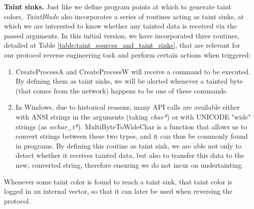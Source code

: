 \documentclass[conference]{IEEEtran}
\begin{document}
\textbf{Taint sinks.} Just like we define program points at which to generate taint colors,
\textit{TaintBlade} also incorporates a series of routines acting as taint sinks,
at which we are interested to know whether any tainted data is received via the passed
arguments. In this initial version, we have incorporated three routines, detailed at
Table \ref{table:taint_sources_and_taint_sinks}, that are relevant for our protocol
reverse engineering task and perform certain actions when triggered:
\begin{enumerate}
    \item CreateProcessA and CreateProcessW will receive a command to be executed. By
          defining them as taint sinks, we will be alerted whenever a tainted byte (that
          comes from the network) happens to be one of these commands.
    \item In Windows, due to historical reasons, many API calls are available either with
          ANSI strings in the arguments (taking \textit{char*}) or with UNICODE "wide"
          strings (as \textit{wchar\_t*}). MultiByteToWideChar is a function that allows
          us to convert strings between these two types, and it can thus be commonly
          found in programs. By defining this routine as taint sink, we are able not only
          to detect whether it receives tainted data, but also to transfer this data to
          the new, converted string, therefore ensuring we do not incur on undertainting.
\end{enumerate}

Whenever some taint color is found to reach a taint sink, that taint color is
logged in an internal vector, so that it can later be used when reversing the
protocol.
\end{document}
